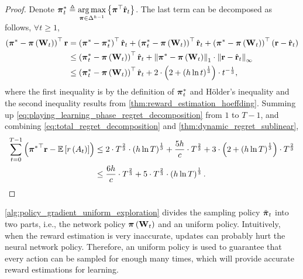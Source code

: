 \begin{proof}
Denote ${\boldsymbol{\pi}}_t^* \triangleq \operatorname*{arg\,max}\limits_{{\boldsymbol{\pi}} \in \Delta^{h-1}}{\left\{ {\boldsymbol{\pi}}^\top \hat{{\mathbf{r}}}_t\right\}}$. The last term can be decomposed as follows, $\forall t \ge 1$,
\begin{equation}
\label{eq:playing_learning_phase_regret_decomposition}
\begin{split}
    \left( {{\boldsymbol{\pi}}^*} - {\boldsymbol{\pi}}\left( {\mathbf{W}}_t \right) \right)^\top {\mathbf{r}} &= \left( {{\boldsymbol{\pi}}^*} - {{\boldsymbol{\pi}}_t^*} \right)^\top \hat{{\mathbf{r}}}_t + \left( {{\boldsymbol{\pi}}_t^*} - {\boldsymbol{\pi}}\left( {\mathbf{W}}_t \right) \right)^\top \hat{{\mathbf{r}}}_t + \left( {{\boldsymbol{\pi}}^*} - {\boldsymbol{\pi}}\left( {\mathbf{W}}_t \right) \right)^\top \left( {\mathbf{r}} - \hat{{\mathbf{r}}}_t \right) \\
    &\le \left( {{\boldsymbol{\pi}}_t^*} - {\boldsymbol{\pi}}\left( {\mathbf{W}}_t \right) \right)^\top \hat{{\mathbf{r}}}_t  + \left\| {\boldsymbol{\pi}}^* - {\boldsymbol{\pi}}\left( {\mathbf{W}}_t \right) \right\|_1 \cdot \left\| {\mathbf{r}} - \hat{{\mathbf{r}}}_t \right\|_\infty \\
    &\le \left( {{\boldsymbol{\pi}}_t^*} - {\boldsymbol{\pi}}\left( {\mathbf{W}}_t \right) \right)^\top \hat{{\mathbf{r}}}_t + 2 \cdot \left( 2 + \left( h \ln{t} \right) ^\frac{1}{3} \right) \cdot t^{- \frac{1}{3}},
\end{split}
\end{equation}
where the first inequality is by the definition of ${\boldsymbol{\pi}}_t^*$ and  H{\"o}lder's inequality and the second inequality results from \cref{thm:reward_estimation_hoeffding}. Summing up \cref{eq:playing_learning_phase_regret_decomposition} from $1$ to $T-1$, and
combining \cref{eq:total_regret_decomposition} and \cref{thm:dynamic_regret_sublinear},
\begin{equation*}
\begin{split}
    \sum\limits_{t=0}^{T-1}{ \left( {{\boldsymbol{\pi}}^*}^\top {\mathbf{r}} - {\mathbb{E}} \left[ r\left(A_t\right) \right] \right) } &\le 2 \cdot T^{\frac{2}{3}} \cdot \left( h \ln{T} \right)^{\frac{1}{3}} + \frac{5 h}{c} \cdot  T^{\frac{2}{3}} + 3 \cdot \left( 2 + \left( h \ln{T} \right) ^\frac{1}{3} \right) \cdot T^{ \frac{2}{3}} \\
    &\le \frac{6 h}{c} \cdot  T^{\frac{2}{3}} + 5 \cdot T^{\frac{2}{3}} \cdot \left( h \ln{T} \right)^{\frac{1}{3}}. \qedhere
\end{split}
\end{equation*}
\end{proof}

\cref{alg:policy_gradient_uniform_exploration} divides the sampling policy $\tilde{{\boldsymbol{\pi}}}_t$ into two parts, i.e., the network policy ${\boldsymbol{\pi}}\left( {\mathbf{W}}_t \right)$ and an uniform policy. Intuitively, when the reward estimation is very inaccurate, updates can probably hurt the neural network policy.  Therefore, an uniform policy is used to guarantee that every action can be sampled for enough many times, which will provide accurate reward estimations for learning. 

